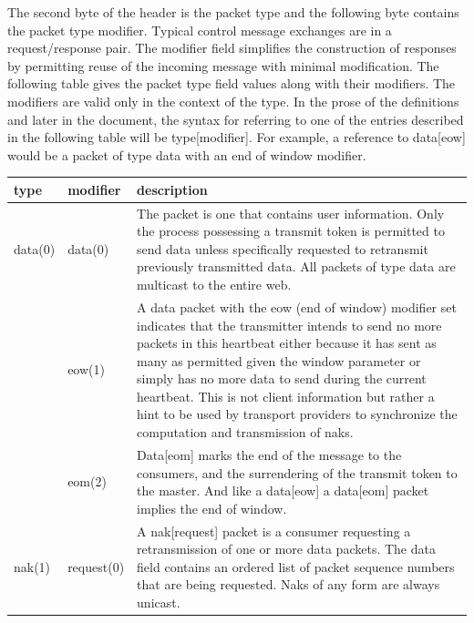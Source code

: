 \documentclass[11pt]{article}
\begin{document}
   The second byte of the header is the packet type and the following
   byte contains the packet type modifier. Typical control message
   exchanges are in a request/response pair. The modifier field
   simplifies the construction of responses by permitting reuse of the
   incoming message with minimal modification. The following table gives
   the packet type field values along with their modifiers. The
   modifiers are valid only in the context of the type. In the prose of
   the definitions and later in the document, the syntax for referring
   to one of the entries described in the following table will be
   type[modifier]. For example, a reference to data[eow] would be a
   packet of type data with an end of window modifier.

\begin{center}
\renewcommand{\arraystretch}{1.5}
\begin{longtable}{llp{}}
   type & modifier & description \\ \hline

   data(0)  & data(0)    & The packet is one that contains user
                           information. Only the process possessing a
                           transmit token is permitted to send data
                           unless specifically requested to retransmit
                           previously transmitted data. All packets of
                           type data are multicast to the entire web. \\

            & eow(1)     & A data packet with the eow (end of window)
                           modifier set indicates that the transmitter
                           intends to send no more packets in this
                           heartbeat either because it has sent as many
                           as permitted given the window parameter or
                           simply has no more data to send during the
                           current heartbeat. This is not client
                           information but rather a hint to be used by
                           transport providers to synchronize the
                           computation and transmission of naks. \\

            & eom(2)     & Data[eom] marks the end of the message to the
                           consumers, and the surrendering of the
                           transmit token to the master. And like a
                           data[eow] a data[eom] packet implies the end
                           of window. \\
   nak(1)   & request(0) & A nak[request] packet is a consumer
                           requesting a retransmission of one or more
                           data packets. The data field contains an
                           ordered list of packet sequence numbers that
                           are being requested. Naks of any form are
                           always unicast. \\


\end{longtable}
\end{center}
\end{document}
